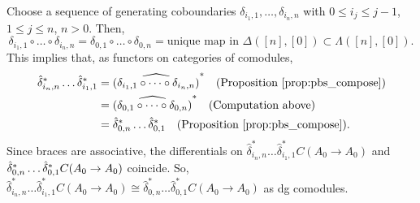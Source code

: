 \begin{eg} 
\label{eg:pb3}
Choose a sequence of generating coboundaries 
$\delta_{i_1,1}, \dots, \delta_{i_n,n}$ with 
$0 \leq i_j \leq j-1$, $1 \leq j \leq n$, 
$n>0$. 
Then,
$$
\delta_{i_1,1} \circ \dots \circ \delta_{i_n,n} 
= \delta_{0,1} \circ \dots \circ \delta_{0,n}
= \textrm{unique map in } \Delta([n],[0])
  \subset \Lambda([n],[0]).
$$
This implies that, as functors 
on categories of comodules, 
\begin{align*}
\hat{\delta}_{i_n,n}^* \dots \hat{\delta}_{i_1,1}^*
&=
\widehat{(\delta_{i_1,1} \circ \dots \circ 
  \delta_{i_n,n})}^*
  \quad \textrm{(Proposition \ref{prop:pbs_compose})}\\
&= 
\widehat{(\delta_{0,1} \circ \dots \circ 
  \delta_{0,n})}^*
  \quad \textrm{(Computation above)}\\
&= 
\hat{\delta}_{0,n}^* \dots \hat{\delta}_{0,1}^* 
  \quad \textrm{(Proposition \ref{prop:pbs_compose}).} 
\end{align*}
Since braces are associative, the 
differentials on $\hat{\delta}_{i_n,n}^* 
\dots \hat{\delta}_{i_1,1}^*C(A_0 \to A_0)$ and 
$\newline 
\hat{\delta}_{0,n}^* 
\dots \hat{\delta}_{0,1}^*C(A_0 \to A_0)$ 
coincide. So, $\hat{\delta}_{i_n,n}^* 
\dots \hat{\delta}_{i_1,1}^*C(A_0 \to A_0)
\cong \hat{\delta}_{0,n}^* 
\dots \hat{\delta}_{0,1}^*C(A_0 \to A_0)$ 
as dg comodules.
\end{eg}
%
